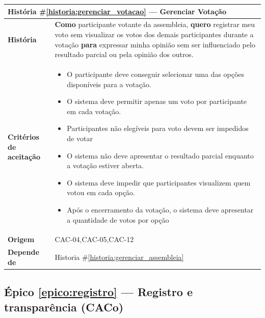 \documentclass[12pt,a4paper]{article}
\newcounter{epico}
\newcounter{historia}
\begin{document}
\label{historia:gerenciar_votacao}
\begin{table}[H]
    \centering
    \begin{tabular}{|m{4.5cm} | m{11cm}|}
    \hline
    
    \multicolumn{2}{|l|}{\textbf{História \#\ref{historia:gerenciar_votacao} --- Gerenciar Votação}} \\
    
    \hline  \textbf{História} &
    \textbf{Como} participante votante da assembleia, \newline
    \textbf{quero} registrar meu voto sem visualizar os votos dos demais participantes durante a votação \newline  
    \textbf{para} expressar minha opinião sem ser influenciado pelo resultado parcial ou pela opinião dos outros. \\
    
    \textbf{Critérios de aceitação} &
    \begin{itemize}
        \item{ O participante deve conseguir selecionar uma das opções disponíveis para a votação.}
        \item{O sistema deve permitir apenas um voto por participante em cada votação.}
        \item{Participantes não elegíveis para voto devem ser impedidos de votar}
        \item{O sistema não deve apresentar o resultado parcial enquanto a votação estiver aberta.}
        \item{O sistema deve impedir que participantes visualizem quem votou em cada opção.}
        \item{Após o encerramento da votação, o sistema deve apresentar a quantidade de votos por opção}
    \end{itemize}\\
    
    \textbf{Origem} &
    CAC-04,CAC-05,CAC-12\\
    
    \textbf{Depende de} &
    Historia \#\ref{historia:gerenciar_assembleia} \\
    
    \hline
    \end{tabular}
\end{table}
\label{epico:registro}
\subsection*{Épico \ref{epico:registro} --- Registro e transparência (CACo)}
\end{document}
